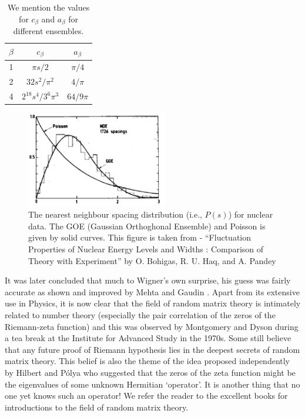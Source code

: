 \documentclass[11pt]{article}
\begin{document}
\begin{table}[h!]
	\centering
	\begin{tabular}{||c c c||} 
		\hline
		$\beta$ & $c_{\beta}$ & $a_{\beta}$ \\ [0.5ex] 
		\hline\hline
		1 & $\pi s/2$ & $\pi/4$  \\ 
		2 & $32 s^2/\pi^2$ & $4/\pi$  \\
		4 & $2^{18} s^4/3^6 \pi^3$ & $64/9\pi$
		 \\ [1ex] 
		\hline 
	\end{tabular}
\caption{We mention the values for $c_{\beta}$ and $a_{\beta}$ for different ensembles.}
\label{table:c_and_a}
\end{table}


\begin{figure}[htbp] 
	\centering 
	\includegraphics[width=0.55\textwidth]{figs/data_exp.png}
	\caption{\label{fig:data_exp1}The nearest neighbour spacing distribution (i.e., $P(s)$) 
	for nuclear data. The GOE (Gaussian Orthoghonal Ensemble) and Poisson is given 
	by solid curves. This figure is taken from - ``Fluctuation Properties of Nuclear Energy 
	Levels and Widths : Comparison of Theory with Experiment'' by O. Bohigas, R. U. 
	Haq, and A. Pandey}
\end{figure}

It was later concluded that much to Wigner's own surprise, 
his guess was fairly accurate as shown and improved by Mehta \cite{MEHTA1960395} and 
Gaudin \cite{GAUDIN1961447}. Apart from its extensive use in Physics, it is now clear that 
the field of random matrix theory is intimately related to number theory 
(especially the pair correlation of the zeros of the Riemann-zeta function) and this was 
observed by Montgomery and Dyson during a tea break at the Institute for Advanced 
Study in the 1970s. Some still believe that any future proof of Riemann hypothesis lies in the
deepest secrets of random matrix theory. This belief is also the theme of the idea proposed 
independently by  Hilbert and P\'{o}lya who suggested that the zeros of the zeta function 
might be the eigenvalues of some unknown Hermitian `operator'. It is another thing that 
no one yet knows such an operator! We refer the reader to the excellent books 
\cite{Meh2004, Akemann:2011csh} for introductions to the field of random matrix theory. 
\end{document}
